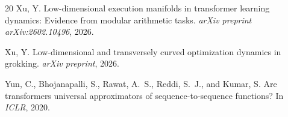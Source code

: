 \documentclass[11pt]{article}
\begin{document}
\begin{thebibliography}{20}
Xu, Y.
\newblock Low-dimensional execution manifolds in transformer learning dynamics: Evidence from modular arithmetic tasks.
\newblock \emph{arXiv preprint arXiv:2602.10496}, 2026.

Xu, Y.
\newblock Low-dimensional and transversely curved optimization dynamics in grokking.
\newblock \emph{arXiv preprint}, 2026.

Yun, C., Bhojanapalli, S., Rawat, A.~S., Reddi, S.~J., and Kumar, S.
\newblock Are transformers universal approximators of sequence-to-sequence functions?
\newblock In \emph{ICLR}, 2020.

\end{thebibliography}
\end{document}
